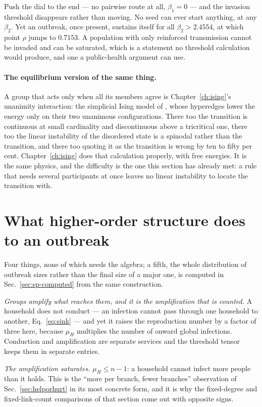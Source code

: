 Push the dial to the end --- no pairwise route at all, $\beta_{1}=0$ --- and the
invasion threshold disappears rather than moving. No seed can ever start
anything, at any $\beta_{2}$. Yet an outbreak, once present, sustains itself for
all $\beta_{2}>2.4554$, at which point $\rho$ jumps to $0.7153$. A population
with only reinforced transmission cannot be invaded and can be saturated, which
is a statement no threshold calculation would produce, and one a public-health
argument can use.

\paragraph{The equilibrium version of the same thing.} A group that acts only
when all its members agree is Chapter~\ref{ch:ising}'s unanimity interaction:
the simplicial Ising model of \citet{son2026}, whose hyperedges lower the
energy only on their two unanimous configurations. There too the transition is
continuous at small cardinality and discontinuous above a tricritical one, there
too the linear instability of the disordered state is a spinodal rather than the
transition, and there too quoting it as the transition is wrong by ten to fifty
per cent. Chapter~\ref{ch:ising} does that calculation properly, with free
energies. It is the same physics, and the difficulty is the one this section has
already met: a rule that needs several participants at once leaves no linear
instability to locate the transition with.

\section{What higher-order structure does to an outbreak}
\label{sec:epidemics-lessons}

Four things, none of which needs the algebra; a fifth, the whole
distribution of outbreak sizes rather than the final size of a major one,
is computed in Sec.~\ref{sec:sp-computed} from the same construction.

\emph{Groups amplify what reaches them, and it is the amplification that is
counted.} A household does not conduct --- an infection cannot pass through one
household to another, Eq.~\eqref{eq:sink} --- and yet it raises the reproduction
number by a factor of three here, because $\mu_{H}$ multiplies the number of
onward global infections. Conduction and amplification are separate services and
the threshold tensor keeps them in separate entries.

\emph{The amplification saturates.} $\mu_{H}\le n-1$: a household cannot infect
more people than it holds. This is the ``more per branch, fewer branches''
observation of Sec.~\ref{sec:helporhurt} in its most concrete form, and it is
why the fixed-degree and fixed-link-count comparisons of that section come out
with opposite signs.

